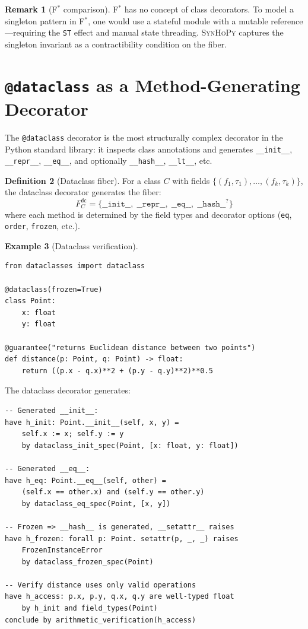 \documentclass[11pt,a4paper]{report}
\theoremstyle{definition}
\newtheorem{definition}{Definition}[chapter]
\newtheorem{example}[definition]{Example}
\newtheorem{remark}[definition]{Remark}
\theoremstyle{plain}
\newcommand{\fstar}{F$^{*}$}
\newcommand{\synhopy}{\textsc{SynHoPy}}
\begin{document}
\begin{remark}[\fstar{} comparison]
\fstar{} has no concept of class decorators. To model a singleton pattern
in \fstar{}, one would use a stateful module with a mutable reference---requiring
the \lstinline[style=fstar]|ST| effect and manual state threading. \synhopy{}
captures the singleton invariant as a contractibility condition on the fiber.
\end{remark}


\section{\texttt{@dataclass} as a Method-Generating Decorator}
\label{sec:dataclass}

The \texttt{@dataclass} decorator is the most structurally complex decorator in
the Python standard library: it inspects class annotations and generates
\texttt{\_\_init\_\_}, \texttt{\_\_repr\_\_}, \texttt{\_\_eq\_\_}, and optionally
\texttt{\_\_hash\_\_}, \texttt{\_\_lt\_\_}, etc.

\begin{definition}[Dataclass fiber]
For a class $C$ with fields $\{(f_1, \tau_1), \ldots, (f_k, \tau_k)\}$, the
dataclass decorator generates the fiber:
\[
  F_C^{\mathsf{dc}} = \{
    \mathtt{\_\_init\_\_},\;
    \mathtt{\_\_repr\_\_},\;
    \mathtt{\_\_eq\_\_},\;
    \mathtt{\_\_hash\_\_}^{?}
  \}
\]
where each method is determined by the field types and decorator options
(\texttt{eq}, \texttt{order}, \texttt{frozen}, etc.).
\end{definition}

\begin{example}[Dataclass verification]
\begin{lstlisting}[style=synhopy]
from dataclasses import dataclass

@dataclass(frozen=True)
class Point:
    x: float
    y: float

@guarantee("returns Euclidean distance between two points")
def distance(p: Point, q: Point) -> float:
    return ((p.x - q.x)**2 + (p.y - q.y)**2)**0.5
\end{lstlisting}

The dataclass decorator generates:
\begin{lstlisting}[style=proof]
-- Generated __init__:
have h_init: Point.__init__(self, x, y) =
    self.x := x; self.y := y
    by dataclass_init_spec(Point, [x: float, y: float])

-- Generated __eq__:
have h_eq: Point.__eq__(self, other) =
    (self.x == other.x) and (self.y == other.y)
    by dataclass_eq_spec(Point, [x, y])

-- Frozen => __hash__ is generated, __setattr__ raises
have h_frozen: forall p: Point. setattr(p, _, _) raises
    FrozenInstanceError
    by dataclass_frozen_spec(Point)

-- Verify distance uses only valid operations
have h_access: p.x, p.y, q.x, q.y are well-typed float
    by h_init and field_types(Point)
conclude by arithmetic_verification(h_access)
\end{lstlisting}
\end{example}
\end{document}
